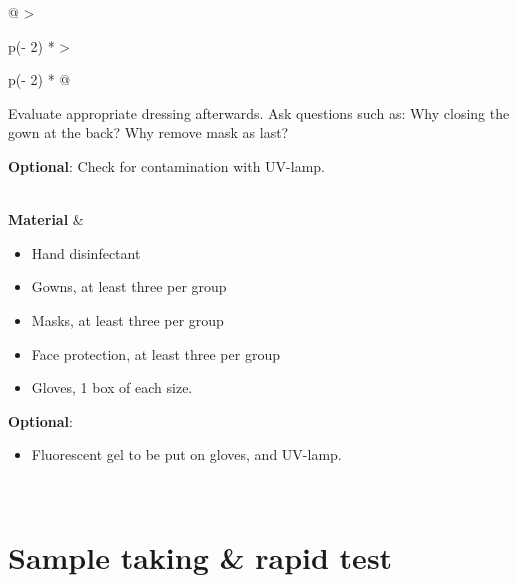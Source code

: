 \documentclass[
]{book}
\providecommand{\tightlist}{%
  \setlength{\itemsep}{0pt}\setlength{\parskip}{0pt}}
\begin{document}
\begin{longtable}[]{@{}
  >{\raggedright\arraybackslash}p{(\columnwidth - 2\tabcolsep) * }
  >{\raggedright\arraybackslash}p{(\columnwidth - 2\tabcolsep) * }@{}}
\begin{minipage}[t]{\linewidth}
Evaluate appropriate dressing afterwards. Ask
questions such as: Why closing the gown at the back?
Why remove mask as last?

\textbf{Optional}: Check for contamination
with UV-lamp.
\end{minipage} \\
\textbf{Material} & \begin{minipage}[t]{\linewidth}\raggedright
\begin{itemize}
\item
  Hand disinfectant
\item
  Gowns, at least three per group
\item
  Masks, at least three per group
\item
  Face protection, at least three per group
\item
  Gloves, 1 box of each size.
\end{itemize}

\textbf{Optional}:

\begin{itemize}
\tightlist
\item
  Fluorescent gel to be put on gloves, and UV-lamp.
\end{itemize}
\end{minipage} \\
\bottomrule
\end{longtable}

\hypertarget{sample-taking-rapid-test}{%
\section{Sample taking \& rapid test}\label{sample-taking-rapid-test}}
\end{document}
